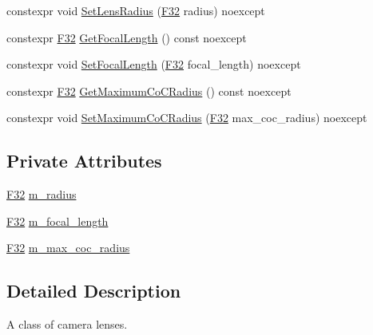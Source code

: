 \begin{DoxyCompactItemize}
\item 
constexpr void \hyperlink{classmage_1_1rendering_1_1_camera_lens_ad7d28ba6b6e462711fb645020697f8ed}{Set\+Lens\+Radius} (\hyperlink{namespacemage_aa97e833b45f06d60a0a9c4fc22ae02c0}{F32} radius) noexcept
\item 
constexpr \hyperlink{namespacemage_aa97e833b45f06d60a0a9c4fc22ae02c0}{F32} \hyperlink{classmage_1_1rendering_1_1_camera_lens_a3372be41a251db2a691a84a6413d7ac9}{Get\+Focal\+Length} () const noexcept
\item 
constexpr void \hyperlink{classmage_1_1rendering_1_1_camera_lens_ad954dd19be6f0cc54c74aecf29bb2134}{Set\+Focal\+Length} (\hyperlink{namespacemage_aa97e833b45f06d60a0a9c4fc22ae02c0}{F32} focal\+\_\+length) noexcept
\item 
constexpr \hyperlink{namespacemage_aa97e833b45f06d60a0a9c4fc22ae02c0}{F32} \hyperlink{classmage_1_1rendering_1_1_camera_lens_aea9eeadbb33600a036a57e797776cbc6}{Get\+Maximum\+Co\+C\+Radius} () const noexcept
\item 
constexpr void \hyperlink{classmage_1_1rendering_1_1_camera_lens_a08305f9e891cbdc4152deccbbf287c7f}{Set\+Maximum\+Co\+C\+Radius} (\hyperlink{namespacemage_aa97e833b45f06d60a0a9c4fc22ae02c0}{F32} max\+\_\+coc\+\_\+radius) noexcept
\end{DoxyCompactItemize}
\subsection*{Private Attributes}
\begin{DoxyCompactItemize}
\item 
\hyperlink{namespacemage_aa97e833b45f06d60a0a9c4fc22ae02c0}{F32} \hyperlink{classmage_1_1rendering_1_1_camera_lens_ac93ec7ffd20ce31ad9707f700a99dc12}{m\+\_\+radius}
\item 
\hyperlink{namespacemage_aa97e833b45f06d60a0a9c4fc22ae02c0}{F32} \hyperlink{classmage_1_1rendering_1_1_camera_lens_a3459fd7d208a7ad8f1cf01718e008e36}{m\+\_\+focal\+\_\+length}
\item 
\hyperlink{namespacemage_aa97e833b45f06d60a0a9c4fc22ae02c0}{F32} \hyperlink{classmage_1_1rendering_1_1_camera_lens_a5c7880aabfbe08addb1fcaf9ac5ff940}{m\+\_\+max\+\_\+coc\+\_\+radius}
\end{DoxyCompactItemize}


\subsection{Detailed Description}
A class of camera lenses. 

